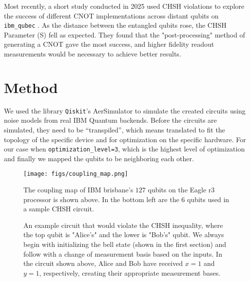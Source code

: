 \documentclass{article}
\begin{document}
Most recently, a short study conducted in 2025 used CHSH violations to explore the success of different CNOT implementations across distant qubits on \verb|ibm_qubec| \cite{waring2025chshviolationsusingdynamic}. As the distance between the entangled qubits rose, the CHSH Parameter (S) fell as expected. They found that the "post-processing" method of generating a CNOT gave the most success, and higher fidelity readout measurements would be necessary to achieve better results.

\section{Method}

We used the library \verb|Qiskit|’s AerSimulator \cite{qiskit2024} to simulate the created circuits using noise models from real IBM Quantum backends. Before the circuits are simulated, they need to be “transpiled”, which means translated to fit the topology of the specific device and for optimization on the specific hardware. For our case when \verb|optimization_level=3|, which is the highest level of optimization and finally we mapped the qubits to be neighboring each other. 

\begin{figure}
    \centering
    \texttt{[image: figs/coupling\_map.png]}
    \caption{The coupling map of IBM brisbane's  $127$ qubits on the Eagle r3 processor is shown above. In the bottom left are the $6$ qubits used in a sample CHSH circuit.}
    \label{fig:coupling-map}
\end{figure}


\begin{figure}
    \centering
    \scalebox{1.25}{
        \[
            \Qcircuit @C=1em @R=1em {
            \lstick{\left| 0 \right\rangle} & \gate{H}  & \ctrl{1} \barrier[0em]{1} & \qw & \gate{H}  \barrier[0em]{1} & \qw & \meter  \\
            \lstick{\left| 0 \right\rangle} & \qw & \targ & \qw & \gate{R_y(\phi)} & \qw  &  \qw & \meter \\
            & \cw & \cw & \cw & \cw & \cw & \cw \cwx[-2] & \cw \cwx[-1] & \cw \\
            }
        \] 
    }
    \caption{An example circuit that would violate the CHSH inequality, where the top qubit is "Alice's" and the lower is "Bob's" qubit. We always begin with initializing the bell state (shown in the first section) and follow with a change of measurement basis based on the inputs. In the circuit shown above, Alice and Bob have received $x = 1$ and $y = 1$, respectively, creating their appropriate measurement bases. }
    \label{fig:circuit-basic}
\end{figure}
\end{document}
